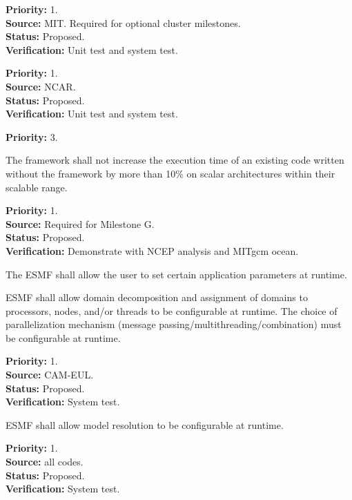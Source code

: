 \begin{reqlist}
{\bf Priority:} 1. \\
{\bf Source:} MIT.  Required for optional cluster milestones. \\
{\bf Status:} Proposed. \\
{\bf Verification:} Unit test and system test.
\end{reqlist}

\begin{reqlist}
{\bf Priority:} 1. \\
{\bf Source:} NCAR. \\
{\bf Status:} Proposed. \\
{\bf Verification:} Unit test and system test.
\end{reqlist}

\begin{reqlist}
  {\bf Priority:} 3.
\end{reqlist}

 \label{perf}
The framework shall not increase the execution time of an existing code 
written without the framework by more than 10\% on scalar 
architectures within their scalable range.
\begin{reqlist}
{\bf Priority:} 1. \\
{\bf Source:} Required for Milestone G. \\
{\bf Status:} Proposed. \\
{\bf Verification:} Demonstrate with NCEP analysis and MITgcm ocean.
\end{reqlist}

 The ESMF shall allow the user to set
certain application parameters at runtime.

 ESMF shall allow domain
decomposition and assignment of domains to processors, nodes, and/or
threads to be configurable at runtime.  The choice of parallelization
mechanism (message passing/multithreading/combination) must be
configurable at runtime.
\begin{reqlist}
{\bf Priority:} 1. \\
{\bf Source:} CAM-EUL. \\
{\bf Status:} Proposed. \\
{\bf Verification:} System test.
\end{reqlist}

ESMF shall allow model resolution to be configurable at runtime.
\begin{reqlist}
{\bf Priority:} 1. \\
{\bf Source:} all codes. \\
{\bf Status:} Proposed. \\
{\bf Verification:} System test.
\end{reqlist}


